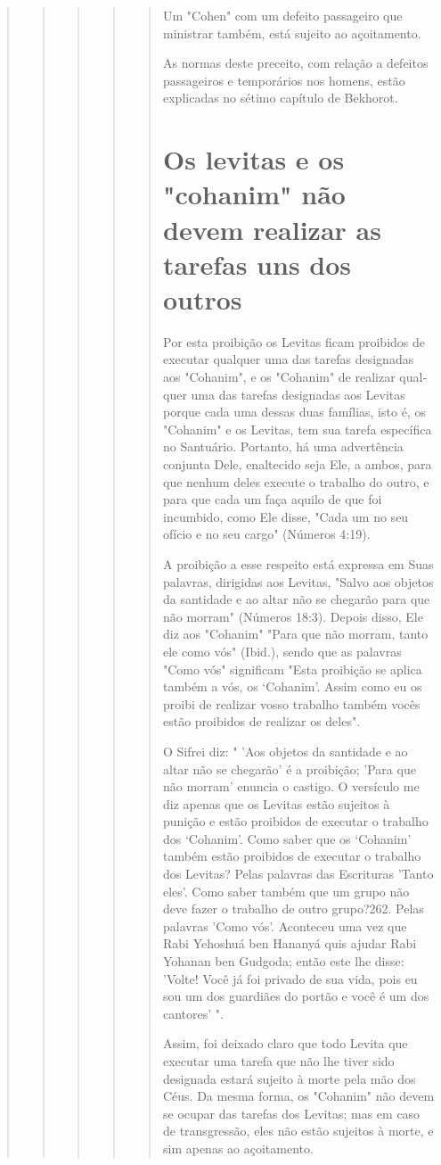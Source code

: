 \begin{quote}
\begin{quote}
\begin{quote}
\begin{quote}
\begin{quote}
Um "Cohen" com um defeito passageiro que ministrar também, es­tá sujeito
ao açoitamento.

As normas deste preceito, com relação a defeitos passageiros e
tem­porários nos homens, estão explicadas no sétimo capítulo de
Bekhorot.

\section{Os levitas e os "cohanim" não devem realizar as tarefas uns dos outros}

Por esta proibição os Levitas ficam proibidos de executar qualquer uma
das tarefas designadas aos "Cohanim", e os "Cohanim" de realizar
qual­quer uma das tarefas designadas aos Levitas porque cada uma dessas
duas famí­lias, isto é, os "Cohanim" e os Levitas, tem sua tarefa
específica no Santuário. Portanto, há uma advertência conjunta Dele,
enaltecido seja Ele, a ambos, para que nenhum deles execute o trabalho
do outro, e para que cada um faça aquilo de que foi incumbido, como Ele
disse, "Cada um no seu ofício e no seu cargo" (Números 4:19).

A proibição a esse respeito está expressa em Suas palavras, dirigidas
aos Levitas, "Salvo aos objetos da santidade e ao altar não se chegarão
para que não morram" (Números 18:3). Depois disso, Ele diz aos "Cohanim"
"Para que não morram, tanto ele como vós" (Ibid.), sendo que as palavras
"Como vós" significam "Esta proibição se aplica também a vós, os
`Cohanim'. Assim como eu os proibi de realizar vosso trabalho também
vocês estão proibidos de reali­zar os deles".

O Sifrei diz: " 'Aos objetos da santidade e ao altar não se chegarão' é
a proibição; 'Para que não morram' enuncia o castigo. O versículo me diz
apenas que os Levitas estão sujeitos à punição e estão proibidos de
executar o trabalho dos `Cohanim'. Como saber que os `Cohanim' também
estão proibi­dos de executar o trabalho dos Levitas? Pelas palavras das
Escrituras 'Tanto eles'. Como saber também que um grupo não deve fazer o
trabalho de outro gru­po?262. Pelas palavras 'Como vós'. Aconteceu uma
vez que Rabi Yehoshuá ben Hananyá quis ajudar Rabi Yohanan ben Gudgoda;
então este lhe disse: 'Volte! Você já foi privado de sua vida, pois eu
sou um dos guardiães do portão e você é um dos cantores' ".

Assim, foi deixado claro que todo Levita que executar uma tarefa que não
lhe tiver sido designada estará sujeito à morte pela mão dos Céus. Da
mesma forma, os "Cohanim" não devem se ocupar das tarefas dos Levitas;
mas em caso de transgressão, eles não estão sujeitos à morte, e sim
apenas ao açoitamento.


\end{quote}
\end{quote}
\end{quote}
\end{quote}
\end{quote}
